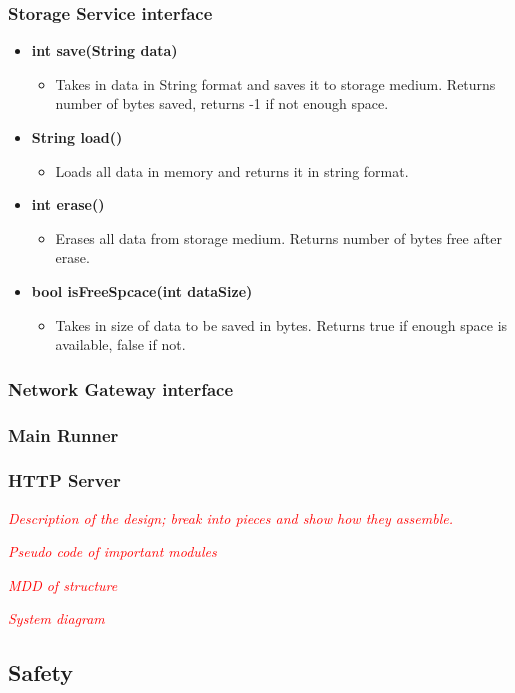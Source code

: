 \subsubsection{Storage Service interface}

\begin{itemize}
	\item \textbf{int save(String data)}
		\begin{itemize}
			\item Takes in data in String format and saves it to storage medium. 
			      Returns number of bytes saved, returns -1 if not enough space.
		\end{itemize}
	\item \textbf{String load()}
		\begin{itemize}
			\item Loads all data in memory and returns it in string format.
		\end{itemize}
	\item \textbf{int erase()}
		\begin{itemize}
			\item Erases all data from storage medium. Returns number of bytes
			      free after erase.
		\end{itemize}
	\item \textbf{bool isFreeSpcace(int dataSize)}
		\begin{itemize}
			\item Takes in size of data to be saved in bytes. Returns true if enough 
			      space is available, false if not.
		\end{itemize}
\end{itemize}


\subsubsection{Network Gateway interface}

\subsubsection{Main Runner}

\subsubsection{HTTP Server}

\textit{\textcolor{red}{Description of the design; break into pieces and show how 
						they assemble.}}

\textit{\textcolor{red}{Pseudo code of important modules}}

\textit{\textcolor{red}{MDD of structure}}

\textit{\textcolor{red}{System diagram}}

\subsection{Safety}
